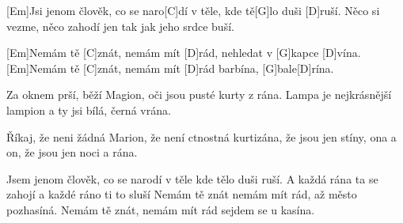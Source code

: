 
[Em]Jsi jenom člověk,
co se naro[C]dí
v těle, kde tě[G]lo duši [D]ruší.
Něco si vezme, něco zahodí
jen tak jak jeho srdce buší.

[Em]Nemám tě [C]znát,
nemám mít [D]rád,
nehledat v [G]kapce [D]vína.
[Em]Nemám tě [C]znát,
nemám mít [D]rád
barbína, [G]bale[D]rína.

Za oknem prší, běží Magion,
oči jsou pusté kurty z rána.
Lampa je nejkrásnější lampion
a ty jsi bílá, černá vrána.

Říkaj, že neni žádná Marion,
že není ctnostná kurtizána,
že jsou jen stíny, ona a on,
že jsou jen noci a rána.

Jsem jenom člověk, co se narodí
v těle kde tělo duši ruší.
A každá rána ta se zahojí
a každé ráno ti to sluší
\slpc
Nemám tě znát
nemám mít rád,
až město pozhasíná.
Nemám tě znát,
nemám mít rád
sejdem se u kasína.
